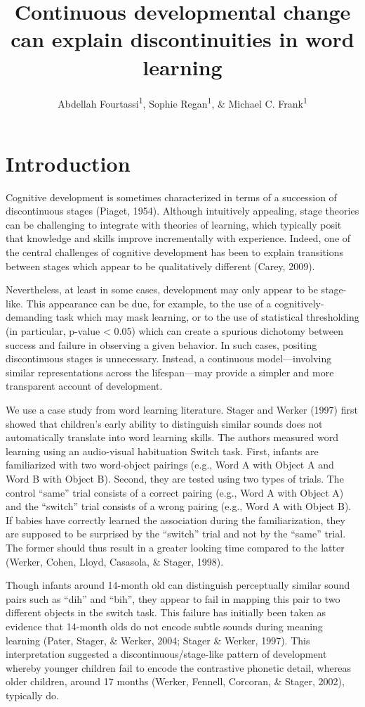 \documentclass[english,,man,floatsintext]{apa6}
\title{Continuous developmental change can explain discontinuities in word
learning}
\author{Abdellah Fourtassi\textsuperscript{1}, Sophie Regan\textsuperscript{1},
\& Michael C. Frank\textsuperscript{1}}
\date{}
\affiliation{
\vspace{0.5cm}
\textsuperscript{1} Department of Psychology, Stanford University}
\theoremstyle{definition}
\theoremstyle{definition}
\theoremstyle{definition}
\theoremstyle{remark}
\begin{document}
\maketitle

\section{Introduction}\label{introduction}

Cognitive development is sometimes characterized in terms of a
succession of discontinuous stages (Piaget, 1954). Although intuitively
appealing, stage theories can be challenging to integrate with theories
of learning, which typically posit that knowledge and skills improve
incrementally with experience. Indeed, one of the central challenges of
cognitive development has been to explain transitions between stages
which appear to be qualitatively different (Carey, 2009).

Nevertheless, at least in some cases, development may only appear to be
stage-like. This appearance can be due, for example, to the use of a
cognitively-demanding task which may mask learning, or to the use of
statistical thresholding (in particular, p-value \textless{} 0.05) which
can create a spurious dichotomy between success and failure in observing
a given behavior. In such cases, positing discontinuous stages is
unnecessary. Instead, a continuous model---involving similar
representations across the lifespan---may provide a simpler and more
transparent account of development.

We use a case study from word learning literature. Stager and Werker
(1997) first showed that children's early ability to distinguish similar
sounds does not automatically translate into word learning skills. The
authors measured word learning using an audio-visual habituation Switch
task. First, infants are familiarized with two word-object pairings
(e.g., Word A with Object A and Word B with Object B). Second, they are
tested using two types of trials. The control \enquote{same} trial
consists of a correct pairing (e.g., Word A with Object A) and the
\enquote{switch} trial consists of a wrong pairing (e.g., Word A with
Object B). If babies have correctly learned the association during the
familiarization, they are supposed to be surprised by the
\enquote{switch} trial and not by the \enquote{same} trial. The former
should thus result in a greater looking time compared to the latter
(Werker, Cohen, Lloyd, Casasola, \& Stager, 1998).

Though infants around 14-month old can distinguish perceptually similar
sound pairs such as \enquote{dih} and \enquote{bih}, they appear to fail
in mapping this pair to two different objects in the switch task. This
failure has initially been taken as evidence that 14-month olds do not
encode subtle sounds during meaning learning (Pater, Stager, \& Werker,
2004; Stager \& Werker, 1997). This interpretation suggested a
discontinuous/stage-like pattern of development whereby younger children
fail to encode the contrastive phonetic detail, whereas older children,
around 17 months (Werker, Fennell, Corcoran, \& Stager, 2002), typically
do.
\end{document}
